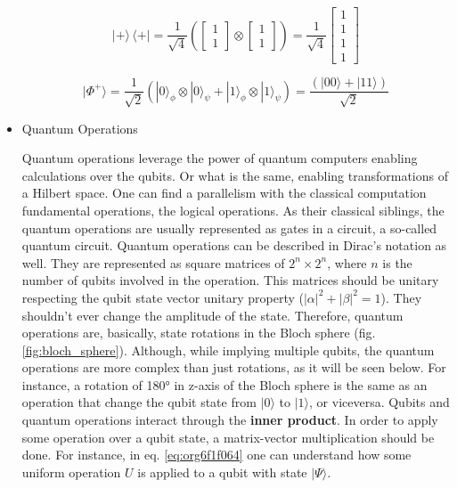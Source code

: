 \begin{itemize}
\begin{equation}
\label{eq:org3c874b9}
|+\rangle \,\langle + | = \frac{1}{\sqrt{4}} \left( \begin{bmatrix}1 \\ 1 \end{bmatrix} \otimes \begin{bmatrix}1 \\ 1 \end{bmatrix} \right) = \frac{1}{\sqrt{4}} \begin{bmatrix}1 \\ 1 \\ 1 \\ 1\end{bmatrix} 
\end{equation}

\begin{equation}
\label{eq:org60cdd73}
|\Phi ^{+}\rangle =\frac  {1}{\sqrt  {2}}(|0\rangle _{\phi}\otimes |0\rangle _{\psi}+|1\rangle _{\phi}\otimes |1\rangle _{\psi}) =  \frac{(|00\rangle +|11\rangle )} {\sqrt {2}}
\end{equation}


\item Quantum Operations
\label{sec:orgb929a71}

Quantum operations leverage the power of quantum computers enabling calculations over the qubits.
Or what is the same, enabling transformations of a Hilbert space.
One can find a parallelism with the classical computation fundamental operations, the logical operations.
As their classical siblings, the quantum operations are usually represented as gates in a circuit, a so-called quantum circuit.
Quantum operations can be described in Dirac's notation as well.
They are represented as square matrices of \(2^{n} \times 2^{n}\), where \(n\) is the number of qubits involved in the operation.
This matrices should be unitary respecting the qubit state vector unitary property (\(|\alpha|^2 + |\beta|^2 = 1\)).
They shouldn't ever change the amplitude of the state.
Therefore, quantum operations are, basically, state rotations in the Bloch sphere (fig. \ref{fig:bloch_sphere}).
Although, while implying multiple qubits, the quantum operations are more complex than just rotations, as it will be seen below.
For instance, a rotation of 180° in z-axis of the Bloch sphere is the same as an operation that change the qubit state from \(| 0 \rangle\) to \(| 1 \rangle\), or viceversa.
Qubits and quantum operations interact through the \textbf{inner product}.
In order to apply some operation over a qubit state, a matrix-vector multiplication should be done.
For instance, in eq. \ref{eq:org6f1f064} one can understand how some uniform operation \(U\) is applied to a qubit with state \(| \Psi \rangle\).


\end{itemize}
